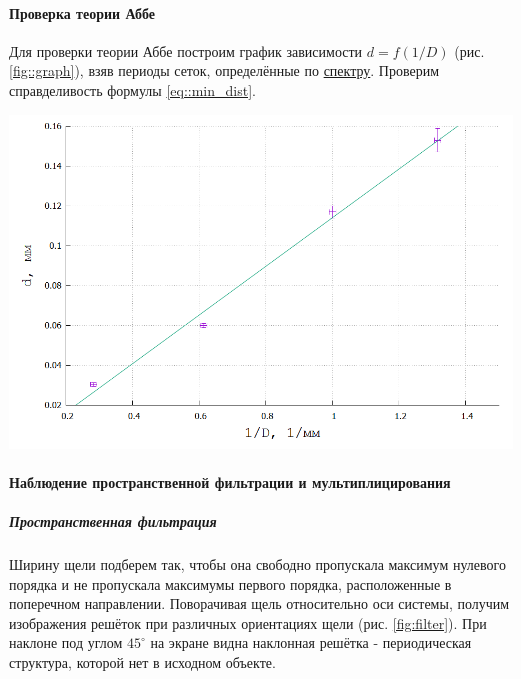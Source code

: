 \documentclass[12pt]{article}
\begin{document}
	\paragraph{Проверка теории Аббе}
	Для проверки теории Аббе построим график зависимости $d = f(1/D)$ (рис.\ref{fig::graph}),
	взяв периоды сеток, определённые по \underline{спектру}. Проверим справделивость формулы \eqref{eq::min_dist}.
	
	\begin{center}
		\includegraphics[scale= 0.8]{graph}
		\label{fig::graph}
	\end{center}	
	
		
	\paragraph{Наблюдение пространственной фильтрации и мультиплицирования}
	\subparagraph{Пространственная фильтрация}
	Ширину щели подберем так, чтобы она свободно пропускала максимум нулевого порядка и не пропускала максимумы первого порядка, расположенные в поперечном направлении. Поворачивая щель
	относительно оси системы, получим изображения решёток при различных ориентациях щели (рис. \ref{fig:filter}). При наклоне под углом $45^{\circ}$ на экране видна наклонная решётка - периодическая структура, которой нет в исходном объекте.
	
\end{document}
